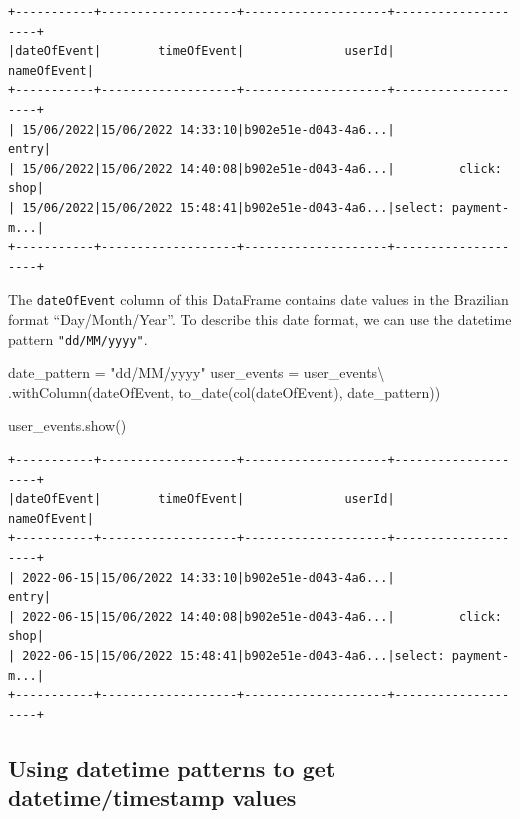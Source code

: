 \documentclass[
  11pt,
  letterpaper,
  DIV=11,
  numbers=noendperiod]{scrreprt}
\newenvironment{Shaded}{\begin{snugshade}}{\end{snugshade}}
\newcommand{\NormalTok}[1]{\textcolor[rgb]{0.00,0.23,0.31}{#1}}
\newcommand{\OperatorTok}[1]{\textcolor[rgb]{0.37,0.37,0.37}{#1}}
\newcommand{\StringTok}[1]{\textcolor[rgb]{0.13,0.47,0.30}{#1}}
\begin{document}
\begin{verbatim}
+-----------+-------------------+--------------------+--------------------+
|dateOfEvent|        timeOfEvent|              userId|         nameOfEvent|
+-----------+-------------------+--------------------+--------------------+
| 15/06/2022|15/06/2022 14:33:10|b902e51e-d043-4a6...|               entry|
| 15/06/2022|15/06/2022 14:40:08|b902e51e-d043-4a6...|         click: shop|
| 15/06/2022|15/06/2022 15:48:41|b902e51e-d043-4a6...|select: payment-m...|
+-----------+-------------------+--------------------+--------------------+
\end{verbatim}

The \texttt{dateOfEvent} column of this DataFrame contains date values
in the Brazilian format ``Day/Month/Year''. To describe this date
format, we can use the datetime pattern \texttt{"dd/MM/yyyy"}.

\begin{Shaded}
\begin{Highlighting}[]
\NormalTok{date\_pattern }\OperatorTok{=} \StringTok{"dd/MM/yyyy"}
\NormalTok{user\_events }\OperatorTok{=}\NormalTok{ user\_events}\OperatorTok{\textbackslash{}}
\NormalTok{    .withColumn(}\StringTok{\textquotesingle{}dateOfEvent\textquotesingle{}}\NormalTok{, to\_date(col(}\StringTok{\textquotesingle{}dateOfEvent\textquotesingle{}}\NormalTok{), date\_pattern))}

\NormalTok{user\_events.show()}
\end{Highlighting}
\end{Shaded}

\begin{verbatim}
+-----------+-------------------+--------------------+--------------------+
|dateOfEvent|        timeOfEvent|              userId|         nameOfEvent|
+-----------+-------------------+--------------------+--------------------+
| 2022-06-15|15/06/2022 14:33:10|b902e51e-d043-4a6...|               entry|
| 2022-06-15|15/06/2022 14:40:08|b902e51e-d043-4a6...|         click: shop|
| 2022-06-15|15/06/2022 15:48:41|b902e51e-d043-4a6...|select: payment-m...|
+-----------+-------------------+--------------------+--------------------+
\end{verbatim}

\hypertarget{using-datetime-patterns-to-get-datetimetimestamp-values}{%
\subsection{Using datetime patterns to get datetime/timestamp
values}\label{using-datetime-patterns-to-get-datetimetimestamp-values}}
\end{document}
